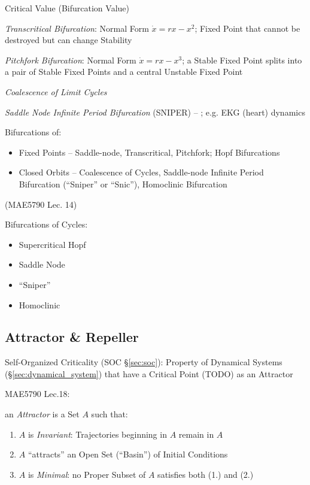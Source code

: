 Critical Value (Bifurcation Value)

\emph{Transcritical Bifurcation}: Normal Form $\dot{x} = rx - x^2$; Fixed Point
that cannot be destroyed but can change Stability

\emph{Pitchfork Bifurcation}: Normal Form $\dot{x} = rx - x^3$; a Stable Fixed
Point splits into a pair of Stable Fixed Points and a central Unstable Fixed
Point

\emph{Coalescence of Limit Cycles}

\emph{Saddle Node Infinite Period Bifurcation} (SNIPER) -- ; e.g. EKG (heart)
dynamics

Bifurcations of:
\begin{itemize}
  \item Fixed Points -- Saddle-node, Transcritical, Pitchfork; Hopf Bifurcations
  \item Closed Orbits -- Coalescence of Cycles,
    Saddle-node Infinite Period Bifurcation (``Sniper'' or ``Snic''),
    Homoclinic Bifurcation
\end{itemize}

(MAE5790 Lec. 14)

Bifurcations of Cycles:
\begin{itemize}
  \item Supercritical Hopf
  \item Saddle Node
  \item ``Sniper''
  \item Homoclinic
\end{itemize}



\subsection{Attractor \& Repeller}\label{sec:attractor_repeller}

\fist Self-Organized Criticality (SOC \S\ref{sec:soc}): Property of Dynamical
Systems (\S\ref{sec:dynamical_system}) that have a Critical Point (TODO) as an
Attractor

MAE5790 Lec.18:

an \emph{Attractor} is a Set $A$ such that:
\begin{enumerate}
  \item $A$ is \emph{Invariant}: Trajectories beginning in $A$ remain in $A$
  \item $A$ ``attracts'' an Open Set (``Basin'') of Initial Conditions
  \item $A$ is \emph{Minimal}: no Proper Subset of $A$ satisfies both (1.) and
    (2.)
\end{enumerate}

